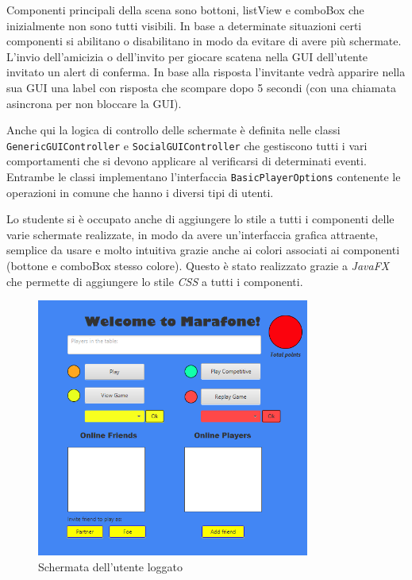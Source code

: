 Componenti principali della scena sono bottoni, listView e comboBox che inizialmente non sono tutti visibili. In base a determinate situazioni certi componenti si abilitano o disabilitano in modo da evitare di avere più schermate.
L’invio dell’amicizia o dell’invito per giocare scatena nella GUI dell’utente invitato un alert di conferma. In base alla risposta l’invitante vedrà apparire nella sua GUI una label con risposta che scompare dopo 5 secondi (con una chiamata asincrona per non bloccare la GUI).

Anche qui la logica di controllo delle schermate è definita nelle classi \texttt{GenericGUIController} e \texttt{SocialGUIController} che gestiscono tutti i vari comportamenti che si devono applicare al verificarsi di determinati eventi. Entrambe le classi implementano l’interfaccia \texttt{BasicPlayerOptions} contenente le operazioni in comune che hanno i diversi tipi di utenti.

Lo studente si è occupato anche di aggiungere lo stile a tutti i componenti delle varie schermate realizzate, in modo da avere un’interfaccia grafica attraente, semplice da usare e molto intuitiva grazie anche ai colori associati ai componenti (bottone e comboBox stesso colore). Questo è stato realizzato grazie a \textit{JavaFX} che permette di aggiungere lo stile \textit{CSS} a tutti i componenti.

\begin{figure}[h!]
 \centering
  \includegraphics[width=0.8\textwidth]{social.png}
   \caption{Schermata dell'utente loggato }
\end{figure}

